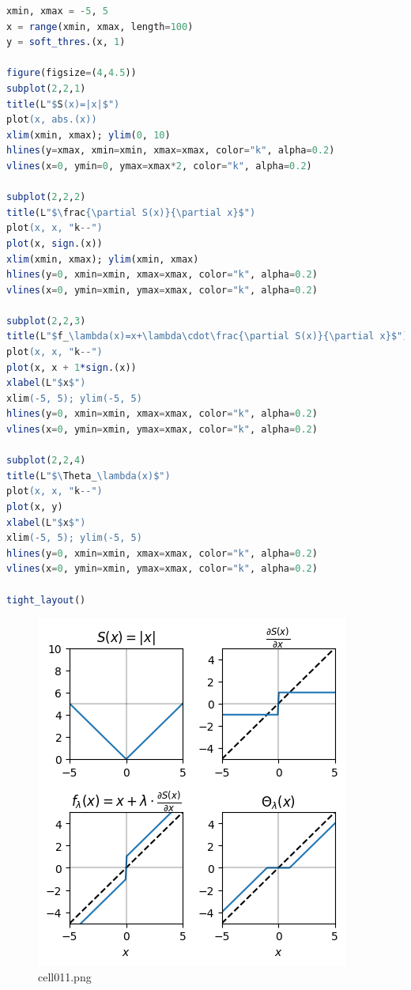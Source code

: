 \begin{lstlisting}[language=julia]
xmin, xmax = -5, 5
x = range(xmin, xmax, length=100)
y = soft_thres.(x, 1)

figure(figsize=(4,4.5))
subplot(2,2,1)
title(L"$S(x)=|x|$")
plot(x, abs.(x))
xlim(xmin, xmax); ylim(0, 10)
hlines(y=xmax, xmin=xmin, xmax=xmax, color="k", alpha=0.2)
vlines(x=0, ymin=0, ymax=xmax*2, color="k", alpha=0.2)

subplot(2,2,2)
title(L"$\frac{\partial S(x)}{\partial x}$")
plot(x, x, "k--")
plot(x, sign.(x))
xlim(xmin, xmax); ylim(xmin, xmax)
hlines(y=0, xmin=xmin, xmax=xmax, color="k", alpha=0.2)
vlines(x=0, ymin=xmin, ymax=xmax, color="k", alpha=0.2)

subplot(2,2,3)
title(L"$f_\lambda(x)=x+\lambda\cdot\frac{\partial S(x)}{\partial x}$")
plot(x, x, "k--")
plot(x, x + 1*sign.(x))
xlabel(L"$x$")
xlim(-5, 5); ylim(-5, 5)
hlines(y=0, xmin=xmin, xmax=xmax, color="k", alpha=0.2)
vlines(x=0, ymin=xmin, ymax=xmax, color="k", alpha=0.2)

subplot(2,2,4)
title(L"$\Theta_\lambda(x)$")
plot(x, x, "k--")
plot(x, y)
xlabel(L"$x$")
xlim(-5, 5); ylim(-5, 5)
hlines(y=0, xmin=xmin, xmax=xmax, color="k", alpha=0.2)
vlines(x=0, ymin=xmin, ymax=xmax, color="k", alpha=0.2)

tight_layout()
\end{lstlisting}
\begin{figure}[ht]
	\centering
	\includegraphics[scale=0.8, max width=\linewidth]{./fig/energy-based-model/sparse-coding/cell011.png}
	\caption{cell011.png}
	\label{cell011.png}
\end{figure}
